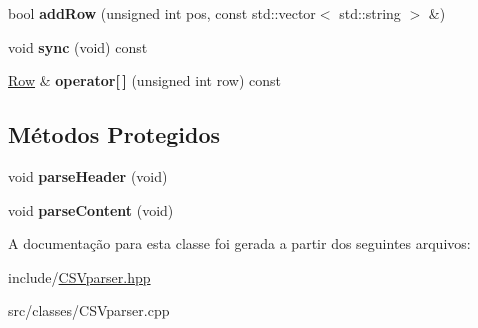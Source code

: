 \begin{DoxyCompactItemize}
\mbox{\label{classcsv_1_1Parser_ae7a0f306922cc4b2b0821051c964fb58}} 
bool {\bfseries add\+Row} (unsigned int pos, const std\+::vector$<$ std\+::string $>$ \&)
\item 
\mbox{\label{classcsv_1_1Parser_aae4f2ef5f35a4e24e017e4c89cfd924b}} 
void {\bfseries sync} (void) const
\item 
\mbox{\label{classcsv_1_1Parser_a64d7144f88ba0d2dad602ef836aa3338}} 
\hyperlink{classcsv_1_1Row}{Row} \& {\bfseries operator\mbox{[}$\,$\mbox{]}} (unsigned int row) const
\end{DoxyCompactItemize}
\subsection*{Métodos Protegidos}
\begin{DoxyCompactItemize}
\item 
\mbox{\label{classcsv_1_1Parser_a886ff444126f46270a6d5cf7a8d582ca}} 
void {\bfseries parse\+Header} (void)
\item 
\mbox{\label{classcsv_1_1Parser_ae384e4f89bfbd12871da9f4ddc3e6e0c}} 
void {\bfseries parse\+Content} (void)
\end{DoxyCompactItemize}


A documentação para esta classe foi gerada a partir dos seguintes arquivos\+:\begin{DoxyCompactItemize}
\item 
include/\hyperlink{CSVparser_8hpp}{C\+S\+Vparser.\+hpp}\item 
src/classes/C\+S\+Vparser.\+cpp\end{DoxyCompactItemize}
